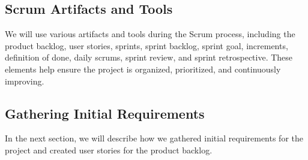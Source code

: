 \subsection*{Scrum Artifacts and Tools}
We will use various artifacts and tools during the Scrum process, including the product backlog, user stories, sprints, sprint backlog, sprint goal, increments, definition of done, daily scrums, sprint review, and sprint retrospective.
These elements help ensure the project is organized, prioritized, and continuously improving.

\subsection*{Gathering Initial Requirements}
In the next section, we will describe how we gathered initial requirements for the project and created user stories for the product backlog.

